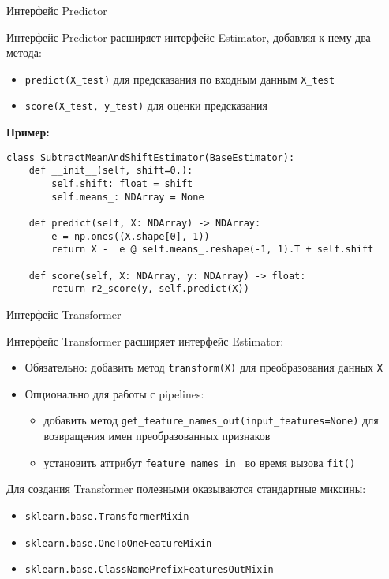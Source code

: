 \documentclass{beamer}
\begin{document}
\begin{frame}[fragile]{Интерфейс Predictor}
    \scriptsize

    Интерфейс Predictor расширяет интерфейс Estimator, добавляя к нему два метода:
    \begin{itemize}
        \item \texttt{predict(X\_test)} для предсказания по входным данным \texttt{X\_test}
        \item \texttt{score(X\_test, y\_test)} для оценки предсказания
    \end{itemize}

    \textbf{Пример:}
    \begin{lstlisting}
class SubtractMeanAndShiftEstimator(BaseEstimator):
    def __init__(self, shift=0.):
        self.shift: float = shift
        self.means_: NDArray = None

    def predict(self, X: NDArray) -> NDArray:
        e = np.ones((X.shape[0], 1))
        return X -  e @ self.means_.reshape(-1, 1).T + self.shift

    def score(self, X: NDArray, y: NDArray) -> float:
        return r2_score(y, self.predict(X))\end{lstlisting}
\end{frame}

\begin{frame}{Интерфейс Transformer}
    \small

    Интерфейс Transformer расширяет интерфейс Estimator:
    \begin{itemize}
        \item Обязательно: добавить метод \texttt{transform(X)} для преобразования данных \texttt{X}
        \item Опционально для работы с pipelines:
        \begin{itemize}
            \scriptsize
            \item добавить метод \texttt{get\_feature\_names\_out(input\_features=None)} для возвращения имен преобразованных признаков
            \item установить аттрибут \texttt{feature\_names\_in\_} во время вызова \texttt{fit()}
        \end{itemize}
    \end{itemize}

    Для создания Transformer полезными оказываются стандартные миксины:
    \begin{itemize}
        \item \texttt{sklearn.base.TransformerMixin}
        \item \texttt{sklearn.base.OneToOneFeatureMixin}
        \item \texttt{sklearn.base.ClassNamePrefixFeaturesOutMixin}
    \end{itemize}
\end{frame}
\end{document}
